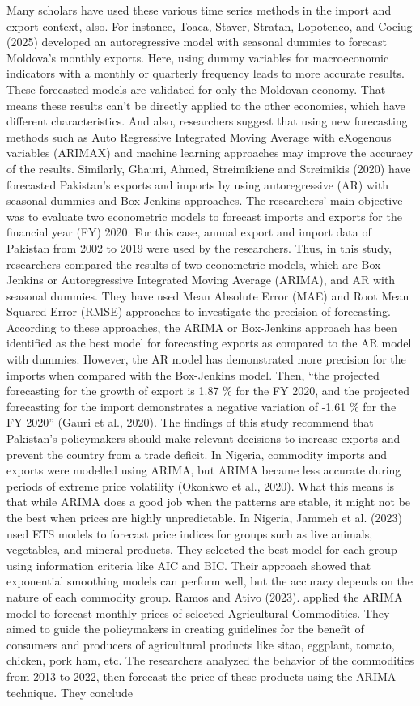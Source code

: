 \documentclass[12pt,a4paper]{report} %
\begin{document}
	Many scholars have used these various time series methods in the import and export context, also. For instance, Toaca, Staver, Stratan, Lopotenco, and Cociug (2025) developed an autoregressive model with seasonal dummies to forecast Moldova’s monthly exports. Here, using dummy variables for macroeconomic indicators with a monthly or quarterly frequency leads to more accurate results. These forecasted models are validated for only the Moldovan economy. That means these results can’t be directly applied to the other economies, which have different characteristics. And also, researchers suggest that using new forecasting methods such as Auto Regressive Integrated Moving Average with eXogenous variables (ARIMAX) and machine learning approaches may improve the accuracy of the results. Similarly, Ghauri, Ahmed, Streimikiene and Streimikis (2020) have forecasted Pakistan’s exports and imports by using autoregressive (AR) with seasonal dummies and Box-Jenkins approaches. The researchers' main objective was to evaluate two econometric models to forecast imports and exports for the financial year (FY) 2020. For this case, annual export and import data of Pakistan from 2002 to 2019 were used by the researchers. Thus, in this study, researchers compared the results of two econometric models, which are Box Jenkins or Autoregressive Integrated Moving Average (ARIMA), and AR with seasonal dummies. They have used Mean Absolute Error (MAE) and Root Mean Squared Error (RMSE) approaches to investigate the precision of forecasting. According to these approaches, the ARIMA or Box-Jenkins approach has been identified as the best model for forecasting exports as compared to the AR model with dummies. However, the AR model has demonstrated more precision for the imports when compared with the Box-Jenkins model. Then, ``the projected forecasting for the growth of export is 1.87 \% for the FY 2020, and the projected forecasting for the import demonstrates a negative variation of -1.61 \% for the FY 2020'' (Gauri et al., 2020). The findings of this study recommend that Pakistan’s policymakers should make relevant decisions to increase exports and prevent the country from a trade deficit. In Nigeria, commodity imports and exports were modelled using ARIMA, but ARIMA became less accurate during periods of extreme price volatility (Okonkwo et al., 2020). What this means is that while ARIMA does a good job when the patterns are stable, it might not be the best when prices are highly unpredictable. In Nigeria, Jammeh et al. (2023) used ETS models to forecast price indices for groups such as live animals, vegetables, and mineral products. They selected the best model for each group using information criteria like AIC and BIC. Their approach showed that exponential smoothing models can perform well, but the accuracy depends on the nature of each commodity group. Ramos and Ativo (2023). applied the ARIMA model to forecast monthly prices of selected Agricultural Commodities. They aimed to guide the policymakers in creating guidelines for the benefit of consumers and producers of agricultural products like sitao, eggplant, tomato, chicken, pork ham, etc. The researchers analyzed the behavior of the commodities from 2013 to 2022, then forecast the price of these products using the ARIMA technique. They conclude 
\end{document}
